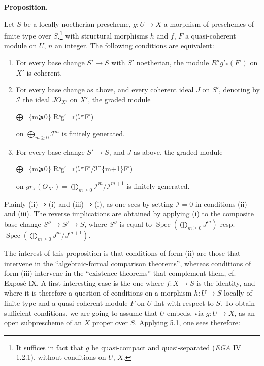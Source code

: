 \documentclass[
]{article}
\newenvironment{Shaded}{}{}
\newcommand{\NormalTok}[1]{#1}
\begin{document}
\textbf{Proposition.}

Let \(S\) be a locally noetherian prescheme, \(g: U \to X\) a morphism
of preschemes of finite type over \(S\),\footnote{It suffices in fact
  that \(g\) be quasi-compact and quasi-separated (\emph{EGA} IV 1.2.1),
  without conditions on \(U\), \(X\).} with structural morphisms \(h\)
and \(f\), \(F\) a quasi-coherent module on \(U\), \(n\) an integer. The
following conditions are equivalent:

\begin{enumerate}
\def\labelenumi{\arabic{enumi}.}
\item
  For every base change \(S' \to S\) with \(S'\) noetherian, the module
  \(R^{n}g'_{\ast}(F')\) on \(X'\) is coherent.
\item
  For every base change as above, and every coherent ideal \(J\) on
  \(S'\), denoting by \(\mathcal{I}\) the ideal \(J O_{X'}\) on \(X'\),
  the graded module

\begin{Shaded}
\begin{Highlighting}[]
\NormalTok{⨁\_\{m⩾0\} Rⁿg′\_∗(ℐᵐF′)}
\end{Highlighting}
\end{Shaded}

  on \(\bigoplus_{m\geqslant 0} \mathcal{I}^{m}\) is finitely generated.
\item
  For every base change \(S' \to S\), and \(J\) as above, the graded
  module

\begin{Shaded}
\begin{Highlighting}[]
\NormalTok{⨁\_\{m⩾0\} Rⁿg′\_∗(ℐᵐF′/ℐ\^{}\{m+1\}F′)}
\end{Highlighting}
\end{Shaded}

  on
  \(gr_{\mathcal{I}}(O_{X'}) = \bigoplus_{m\geqslant 0} \mathcal{I}^{m}/\mathcal{I}^{m+1}\)
  is finitely generated.
\end{enumerate}

Plainly (ii) ⇒ (i) and (iii) ⇒ (i), as one sees by setting
\(\mathcal{I} = 0\) in conditions (ii) and (iii). The reverse
implications are obtained by applying (i) to the composite base change
\(S'' \to S' \to S\), where \(S''\) is equal to
\(\operatorname{Spec}(\bigoplus_{m\geqslant 0} J^{m})\) resp.
\(\operatorname{Spec}(\bigoplus_{m\geqslant 0} J^{m}/J^{m+1})\).

The interest of this proposition is that conditions of form (ii) are
those that intervene in the ``algebraic-formal comparison theorems'',
whereas conditions of form (iii) intervene in the ``existence theorems''
that complement them, cf. Exposé IX. A first interesting case is the one
where \(f: X \to S\) is the identity, and where it is therefore a
question of conditions on a morphism \(h: U \to S\) locally of finite
type and a quasi-coherent module \(F\) on \(U\) flat with respect to
\(S\). To obtain sufficient conditions, we are going to assume that
\(U\) embeds, via \(g: U \to X\), as an open subprescheme of an \(X\)
proper over \(S\). Applying 5.1, one sees therefore:
\end{document}
